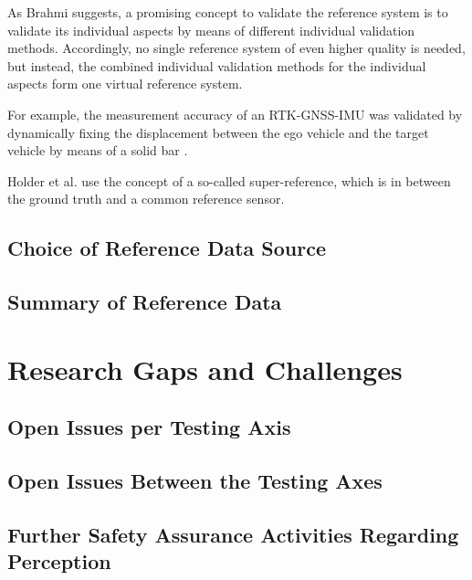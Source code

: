 \documentclass[conference]{IEEEtran}
\begin{document}
As Brahmi \cite[Sec. 10, Sec. 14]{Brahmi2020diss} suggests, a promising concept to validate the reference system is to validate its individual aspects by means of different individual validation methods. 
Accordingly, no single reference system of even higher quality is needed, but instead, the combined individual validation methods for the individual aspects form one virtual reference system. 

For example, the measurement accuracy of an RTK-GNSS-IMU was validated by dynamically fixing the displacement between the ego vehicle and the target vehicle by means of a solid bar \cite[Sec. 14.2]{Brahmi2020diss}. 

Holder et al. \cite{Holder2022calibration} use the concept of a so-called super-reference, which is in between the ground truth and a common reference sensor. 

\subsection{Choice of Reference Data Source}
\label{sec:ref_data_tradeoffs}

\subsection{Summary of Reference Data}
\label{sec:ref_data_conclusion}



\section{Research Gaps and Challenges}
\label{sec:discussion}

\subsection{Open Issues per Testing Axis}
\label{sec:discussion_answers}



\subsection{Open Issues Between the Testing Axes}
\label{sec:discussion_interdependencies}



\subsection{Further Safety Assurance Activities Regarding Perception} 
\label{sec:discussion_other_activities}
\end{document}
